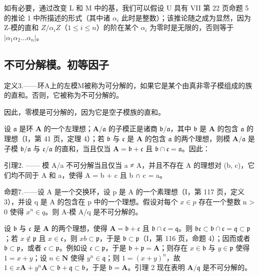 如有必要，通过改变 L 和 M 中的基，我们可以假设 U 具有 VII 第 22 页命题 5 的推论 1 中所描述的形式（其中诸 \(\alpha_{i}\) 此时是整数）；该推论随之成为显然，因为 Z-模的直和 \(Z/\alpha_{i}Z\)（\(1 \leqslant i \leqslant n\)）的阶在某个 \(\alpha_{i}\) 为零时是无限的，否则等于 \(|\alpha_{1}\alpha_{2} \ldots \alpha_{n}|\)。

\subsection{不可分解模。初等因子}

定义3.——环A上的左模M被称为可分解的，如果它是某个由真非零子模组成的族的直和。否则，它被称为不可分解的。

因此，零模是可分解的，因为它是空子模族的直和。

设 \(\mathfrak{a}\) 是环 \(\mathbf{A}\) 的一个左理想；\(\mathbf{A} / \mathfrak{a}\) 的子模正是诸商 \(\mathfrak{b} / \mathfrak{a}\)，其中 \(\mathfrak{b}\) 是 \(\mathbf{A}\) 的包含 \(\mathfrak{a}\) 的理想（I，第 41 页，定理 4）；若 \(\mathfrak{b}\) 与 \(\mathfrak{c}\) 是 \(\mathbf{A}\) 的包含 \(\mathfrak{a}\) 的两个理想，则模 \(\mathbf{A} / \mathfrak{a}\) 是子模 \(\mathfrak{b} / \mathfrak{a}\) 与 \(\mathfrak{c} / \mathfrak{a}\) 的直和，当且仅当 \(\mathbf{A} = \mathfrak{b} + \mathfrak{c}\) 且 \(\mathfrak{b} \cap \mathfrak{c} = \mathfrak{a}\)。因此：

引理2. —— 模 A/a 不可分解当且仅当 a ≠ A，并且不存在 A 的理想对 (b, c)，它们均不同于 A 和 a，使得 A = b + c 且 b ∩ c = a。

命题7.——设 A 是一个交换环，设 p 是 A 的一个素理想（I，第 117 页，定义 3），并设 q 是 A 的包含在 p 中的一个理想。假设对每个 \(x \in p\) 存在一个整数 n \textgreater{} 0 使得 \(x^{n} \in q\)。则 A-模 A/q 是不可分解的。

设 \(\mathfrak{b}\) 与 \(\mathfrak{c}\) 是 \(\mathbf{A}\) 的两个理想，使得 \(\mathbf{A} = \mathfrak{b} + \mathfrak{c}\) 且 \(\mathfrak{b} \cap \mathfrak{c} = \mathfrak{q}\)。则 \(\mathfrak{bc} \subset \mathfrak{b} \cap \mathfrak{c} = \mathfrak{q} \subset \mathfrak{p}\)；若 \(x \notin \mathfrak{p}\) 且 \(x \in \mathfrak{c}\)，则 \(xb \subset \mathfrak{p}\)，于是 \(\mathfrak{b} \subset \mathfrak{p}\)（I，第 116 页，命题 4）；因而或者 \(\mathfrak{b} \subset \mathfrak{p}\)，或者 \(\mathfrak{c} \subset \mathfrak{p}\)。例如设 \(\mathfrak{c} \subset \mathfrak{p}\)，于是 \(\mathfrak{b} + \mathfrak{p} = \mathbf{A}\)；则存在 \(x \in \mathfrak{b}\) 与 \(y \in \mathfrak{p}\) 使得 \(1 = x + y\)；设 \(n \in \mathbf{N}\) 使得 \(y^n \in \mathfrak{q}\)；则 \(1 = (x + y)^n\)，故 \(1 \in x\mathbf{A} + y^n\mathbf{A} \subset \mathfrak{b} + \mathfrak{q} \subset \mathfrak{b}\)，于是 \(\mathfrak{b} = \mathbf{A}\)。引理 2 现在表明 \(\mathbf{A}/\mathfrak{q}\) 是不可分解的。

